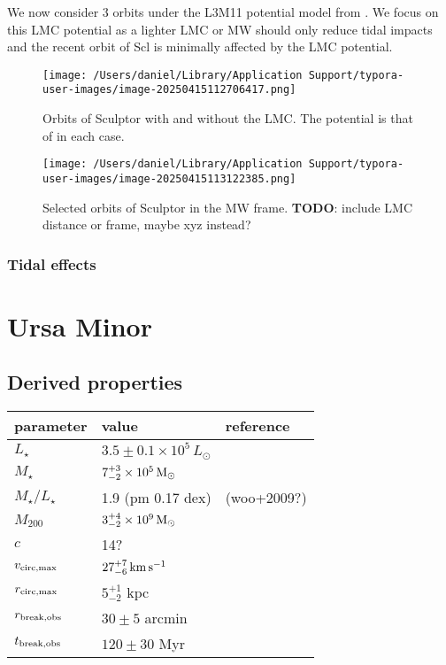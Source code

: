 We now consider 3 orbits under the L3M11 potential model from
\citet{vasiliev2024}. We focus on this LMC potential as a lighter LMC or
MW should only reduce tidal impacts and the recent orbit of Scl is
minimally affected by the LMC potential.

\begin{figure}
\centering
\texttt{[image: /Users/daniel/Library/Application Support/typora-user-images/image-20250415112706417.png]}
\caption[Effect of LMC on Sculptor's Orbit]{Orbits of Sculptor with and
without the LMC. The potential is that of \citet{vasiliev+2021} in each
case.}
\end{figure}

\begin{figure}
\centering
\texttt{[image: /Users/daniel/Library/Application Support/typora-user-images/image-20250415113122385.png]}
\caption[Selected orbits of Sculptor with an LMC]{Selected orbits of
Sculptor in the MW frame. \textbf{TODO}: include LMC distance or frame,
maybe xyz instead?}
\end{figure}

\subsubsection{Tidal effects}\label{tidal-effects-1}

\section{Ursa Minor}\label{ursa-minor}

\subsection{Derived properties}\label{derived-properties-1}

\begin{table*}[t]
\centering
\begin{tabular}{lll}
\toprule
parameter & value & reference\\
\midrule
$L_\star$ & $3.5 \pm 0.1 \times 10^5\,L_\odot$ & \\
$M_\star$ & $7_{-2}^{+3} \times 10^5\,{\rm M}_{\odot}$ & \\
$M_\star / L_\star$ & 1.9 (pm 0.17 dex) & (woo+2009?)\\
$M_{200}$ & $3_{-2}^{+4} \times 10^9\,{\rm M}_{\odot}$ & \\
$c$ & 14? & \\
$v_{\rm circ, max}$ & $27_{-6}^{+7}\,{\rm km\,s^{-1}}$ & \\
$r_{\rm circ, max}$ & $5_{-2}^{+1}$ kpc & \\
$r_{\rm break, obs}$ & $30 \pm 5$ arcmin & \\
$t_{\rm break, obs}$ & $120\pm30$ Myr & \\
\bottomrule
\end{tabular}
\end{table*}

